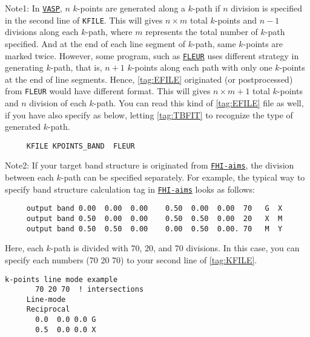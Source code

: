 \documentclass[a4paper,12pt]{scrartcl}
\begin{document}
\begin{description}
    Note1: In \href{https://www.vasp.at}{\texttt{VASP}}, $n$ $k$-points are generated along a $k$-path if $n$ 
    division is specified in the second line of \texttt{KFILE}. This will gives $n \times m$ total $k$-points and $n-1$ divisions along each $k$-path, where $m$ represents the total number of $k$-path specified. And at the end of each line segment of $k$-path, same $k$-points are marked twice. 
    However, some program, 
    such as \href{http://www.flapw.de}{\texttt{FLEUR}} uses different strategy 
    in generating $k$-path, that is, 
    $n+1$ $k$-points along each path with only one $k$-points at the end
    of line segments. Hence, \ref{tag:EFILE} originated (or postprocessed) 
    from \texttt{FLEUR} would have different format.
    This will gives $n \times m + 1$ total $k$-points and $n$ division of 
    each $k$-path. You can read this kind of \ref{tag:EFILE} file as well, if you have 
    also specify as below, letting \ref{tag:TBFIT} to recognize the type of 
    generated $k$-path.
    
     \begin{verbatim}
     KFILE KPOINTS_BAND  FLEUR
     \end{verbatim}
    
        Note2: If your target band structure is originated from \href{https://aimsclub.fhi-berlin.mpg.de}{\texttt{FHI-aims}}, 
        the division between each $k$-path can be specified separately. For example, the typical way to specify band structure calculation tag
        in \href{https://aimsclub.fhi-berlin.mpg.de}{\texttt{FHI-aims}} looks as follows:
        
     \begin{verbatim}
     output band 0.00  0.00  0.00    0.50  0.00  0.00  70   G  X
     output band 0.50  0.00  0.00    0.50  0.50  0.00  20   X  M
     output band 0.50  0.50  0.00    0.00  0.50  0.00. 70   M  Y
     \end{verbatim}
     
     Here, each $k$-path is divided with 70, 20, and 70 divisions.
     In this case, you can specify each numbers (70 20 70) to your second line of  \ref{tag:KFILE}.

        \begin{Verbatim}[commandchars=\\\{\},gobble=4, frame=single, framesep=2mm, 
            label= KPOINTS\_BAND $line$ $mode$ (FHI-aims type), 
            labelposition=bottomline]
     k-points line mode example
       70 20 70  ! intersections
     Line-mode
     Reciprocal
       0.0  0.0 0.0 G
       0.5  0.0 0.0 X
       

\end{Verbatim}
\end{description}
\end{document}
